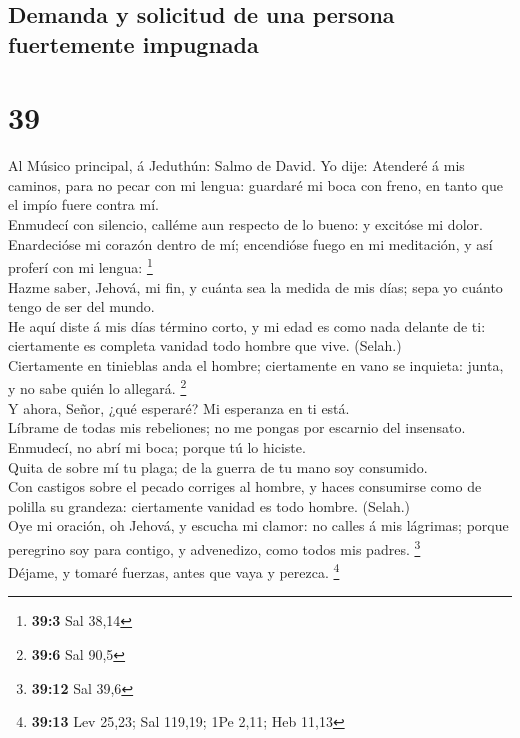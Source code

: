 \hypertarget{demanda-y-solicitud-de-una-persona-fuertemente-impugnada}{%
\subsection{Demanda y solicitud de una persona fuertemente
impugnada}\label{demanda-y-solicitud-de-una-persona-fuertemente-impugnada}}

\hypertarget{section-38}{%
\section{39}\label{section-38}}

 Al Músico principal, á Jeduthún: Salmo de David. Yo dije:
Atenderé á mis caminos, para no pecar con mi lengua: guardaré mi boca
con freno, en tanto que el impío fuere contra mí.\\
 Enmudecí con silencio, calléme aun respecto de lo bueno: y
excitóse mi dolor.\\
 Enardecióse mi corazón dentro de mí; encendióse fuego en mi
meditación, y así proferí con mi lengua: \footnote{\textbf{39:3} Sal
  38,14}\\
 Hazme saber, Jehová, mi fin, y cuánta sea la medida de mis
días; sepa yo cuánto tengo de ser del mundo.\\
 He aquí diste á mis días término corto, y mi edad es como
nada delante de ti: ciertamente es completa vanidad todo hombre que
vive. (Selah.)\\
 Ciertamente en tinieblas anda el hombre; ciertamente en
vano se inquieta: junta, y no sabe quién lo allegará. \footnote{\textbf{39:6}
  Sal 90,5}\\
 Y ahora, Señor, ¿qué esperaré? Mi esperanza en ti está.\\
 Líbrame de todas mis rebeliones; no me pongas por escarnio
del insensato.\\
 Enmudecí, no abrí mi boca; porque tú lo hiciste.\\
 Quita de sobre mí tu plaga; de la guerra de tu mano soy
consumido.\\
 Con castigos sobre el pecado corriges al hombre, y haces
consumirse como de polilla su grandeza: ciertamente vanidad es todo
hombre. (Selah.)\\
 Oye mi oración, oh Jehová, y escucha mi clamor: no calles
á mis lágrimas; porque peregrino soy para contigo, y advenedizo, como
todos mis padres. \footnote{\textbf{39:12} Sal 39,6}\\
 Déjame, y tomaré fuerzas, antes que vaya y perezca.
\footnote{\textbf{39:13} Lev 25,23; Sal 119,19; 1Pe 2,11; Heb 11,13}

